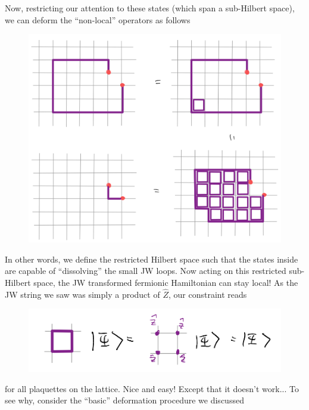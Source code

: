 Now, restricting our attention to these states (which span a sub-Hilbert space), we can deform the ``non-local'' operators as follows
\begin{figure}[H]
    \centering
    \includegraphics[width=\textwidth]{jupyterbook/data/fig/lec26-fig11.png}
\end{figure}
In other words, we define the restricted Hilbert space such that the states inside are capable of ``dissolving'' the small JW loops. Now acting on this restricted sub-Hilbert space, the JW transformed fermionic Hamiltonian can stay local! As the JW string we saw was simply a product of $\hat{Z}$, our constraint reads
\begin{figure}[H]
    \centering
    \includegraphics[width=\textwidth]{jupyterbook/data/fig/lec26-fig12.png}
\end{figure}
for all plaquettes on the lattice. Nice and easy! Except that it doesn't work... To see why, consider the ``basic'' deformation procedure we discussed
